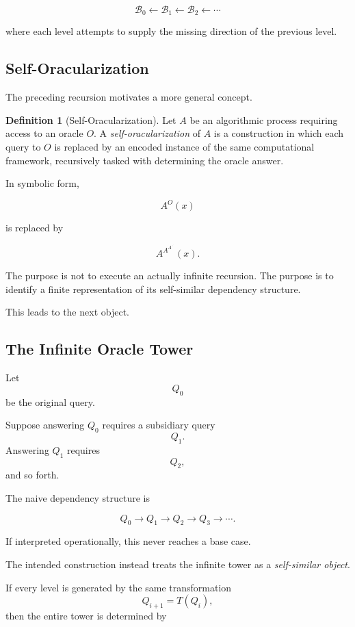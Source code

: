\documentclass[11pt]{article}
\theoremstyle{plain}
\theoremstyle{definition}
\newtheorem{definition}[theorem]{Definition}
\begin{document}
\[
\boxed{
\mathcal{B}_0
\leftarrow
\mathcal{B}_1
\leftarrow
\mathcal{B}_2
\leftarrow
\cdots
}
\]

where each level attempts to supply the missing direction of the previous
level.

\subsection{Self-Oracularization}

The preceding recursion motivates a more general concept.

\begin{definition}[Self-Oracularization]
\label{def:self-oracularization}
Let \(A\) be an algorithmic process requiring access to an oracle \(O\).
A \emph{self-oracularization} of \(A\) is a construction in which each query
to \(O\) is replaced by an encoded instance of the same computational
framework, recursively tasked with determining the oracle answer.
\end{definition}

In symbolic form,

\[
    A^O(x)
\]

is replaced by

\[
    A^{A^{A^{\cdot^{\cdot^{\cdot}}}}}(x).
\]

The purpose is not to execute an actually infinite recursion.  The purpose is
to identify a finite representation of its self-similar dependency
structure.

This leads to the next object.

\subsection{The Infinite Oracle Tower}

Let
\[
    Q_0
\]
be the original query.

Suppose answering \(Q_0\) requires a subsidiary query
\[
    Q_1.
\]
Answering \(Q_1\) requires
\[
    Q_2,
\]
and so forth.

The naive dependency structure is

\[
    Q_0
    \to
    Q_1
    \to
    Q_2
    \to
    Q_3
    \to
    \cdots.
\]

If interpreted operationally, this never reaches a base case.

The intended construction instead treats the infinite tower as a
\emph{self-similar object}.

If every level is generated by the same transformation
\[
    Q_{i+1}=T(Q_i),
\]
then the entire tower is determined by
\end{document}
